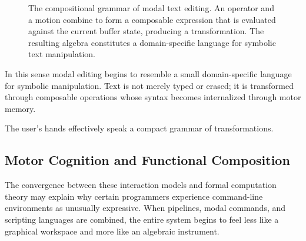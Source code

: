 \documentclass[12pt]{article}
\theoremstyle{definition}
\begin{document}
\begin{figure}[h]
\centering
{}
\caption{The compositional grammar of modal text editing. An operator
and a motion combine to form a composable expression that is evaluated
against the current buffer state, producing a transformation. The
resulting algebra constitutes a domain-specific language for symbolic
text manipulation.}
\label{fig:modal_grammar}
\end{figure}

In this sense modal editing begins to resemble a small domain-specific
language for symbolic manipulation. Text is not merely typed or erased;
it is transformed through composable operations whose syntax becomes
internalized through motor memory.

The user's hands effectively speak a compact grammar of transformations.

\subsection{Motor Cognition and Functional Composition}

The convergence between these interaction models and formal computation
theory may explain why certain programmers experience command-line
environments as unusually expressive. When pipelines, modal commands,
and scripting languages are combined, the entire system begins to feel
less like a graphical workspace and more like an algebraic instrument.
\end{document}
